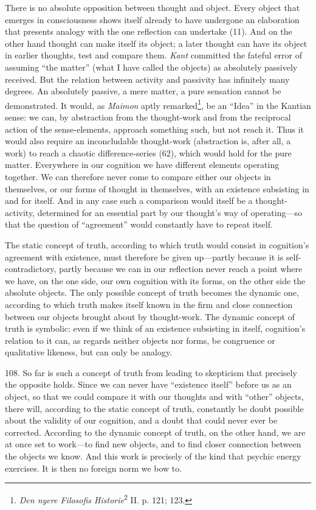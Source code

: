 \documentclass[12pt,a4paper]{book}
\newcommand{\opage}[1]{\marginnote{\footnotesize\textit{[#1]}}}
\begin{document}
There is no absolute opposition between thought and object. Every object that
emerges in consciousness shows itself already to have undergone an elaboration
that presents analogy with the one reflection can undertake (11). And on the
other hand thought can make itself its object; a later thought can have its
object in earlier thoughts, test and compare them. \emph{Kant} committed the
fateful error of assuming ``the matter'' (what I have called the objects) as
absolutely passively received. But the relation between activity and passivity
has infinitely many degrees. An absolutely passive, a \opage{259}mere matter, a pure
sensation cannot be demonstrated. It would, as \emph{Maimon} aptly
remarked\footnote{\emph{Den nyere Filosofis Historie}\textsuperscript{2} II.
p. 121; 123.}, be an ``Idea'' in the Kantian sense: we can, by abstraction
from the thought-work and from the reciprocal action of the sense-elements,
approach something such, but not reach it. Thus it would also require an
inconcludable thought-work (abstraction is, after all, a work) to reach a
chaotic difference-series (62), which would hold for the pure matter.
Everywhere in our cognition we have different elements operating together. We
can therefore never come to compare either our objects in themselves, or our
forms of thought in themselves, with an existence subsisting in and for
itself. And in any case such a comparison would itself be a thought-activity,
determined for an essential part by our thought's way of operating---so that
the question of ``agreement'' would constantly have to repeat itself.

The static concept of truth, according to which truth would consist in
cognition's agreement with existence, must therefore be given up---partly
because it is self-contradictory, partly because we can in our reflection
never reach a point where we have, on the one side, our own cognition with its
forms, on the other side the absolute objects. The only possible concept of
truth becomes the dynamic one, according to which truth makes itself known in
the firm and close connection between our objects brought about by
thought-work. The dynamic concept of truth is symbolic: even if we think of an
existence subsisting in itself, cognition's relation to it can, as regards
neither objects nor forms, be congruence or qualitative likeness, but can only
be analogy.

108. So far is such a concept of truth from leading to skepticism that
precisely the opposite holds. Since we can never have ``existence itself''
before us as an object, so that we could compare it with our thoughts and with
``other'' objects, there will, according to the static concept of truth,
constantly be doubt possible about the validity of \opage{260}our cognition, and a doubt
that could never ever be corrected. According to the dynamic concept of truth,
on the other hand, we are at once set to work---to find new objects, and to
find closer connection between the objects we know. And this work is precisely
of the kind that psychic energy exercises. It is then no foreign norm we bow
to.
\end{document}
